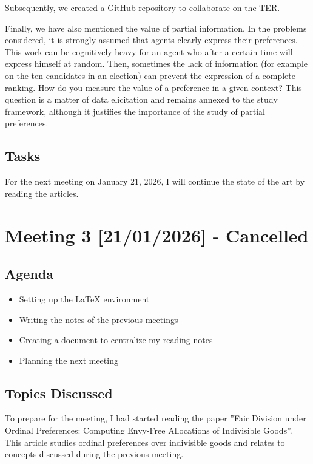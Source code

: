 \documentclass{article}
\begin{document}
Subsequently, we created a GitHub repository to collaborate on the TER.

Finally, we have also mentioned the value of partial information. In the problems considered, it is strongly assumed that agents clearly express their preferences. This work can be cognitively heavy for an agent who after a certain time will express himself at random. Then, sometimes the lack of information (for example on the ten candidates in an election) can prevent the expression of a complete ranking. How do you measure the value of a preference in a given context? This question is a matter of data elicitation and remains annexed to the study framework, although it justifies the importance of the study of partial preferences.

\subsection{Tasks}
For the next meeting on January 21, 2026, I will continue the state of the art by reading the articles.

\newpage


\section{Meeting 3 [21/01/2026] - Cancelled}

\subsection{Agenda}
\begin{itemize}
    \item Setting up the LaTeX environment
    \item Writing the notes of the previous meetings
    \item Creating a document to centralize my reading notes
    \item Planning the next meeting
\end{itemize}

\subsection{Topics Discussed}

To prepare for the meeting, I had started reading the paper ''Fair Division under Ordinal Preferences: Computing Envy-Free Allocations of Indivisible Goods''.
This article studies ordinal preferences over indivisible goods and relates to concepts discussed during the previous meeting.
\end{document}
